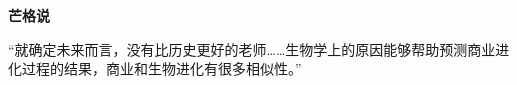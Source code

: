 \renewcommand{\bookchapter}{书单2}
\cleardoublepage
{}

\textbf{芒格说}
\par

\begin{MungerSaysBox}
{\kaishu “就确定未来而言，没有比历史更好的老师……生物学上的原因能够帮助预测商业进化过程的结果，商业和生物进化有很多相似性。”}
\par
\end{MungerSaysBox}

\cleardoublepage








